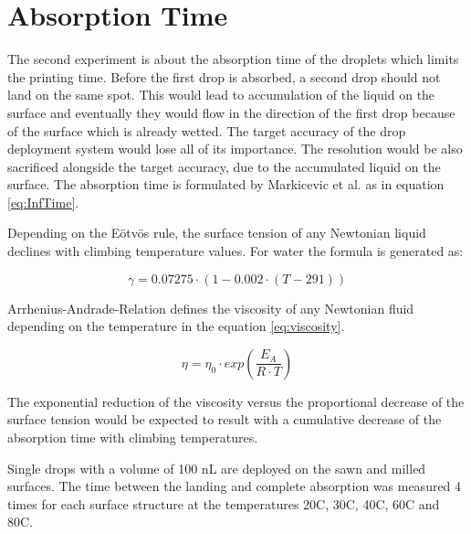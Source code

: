 \section{Absorption Time}
The second experiment is about the absorption time of the droplets which limits the printing time. Before the first drop is absorbed, a second drop should not land on the same spot. This would lead to accumulation of the liquid on the surface and eventually they would flow in the direction of the first drop because of the surface which is already wetted. The target accuracy of the drop deployment system would lose all of its importance. The resolution would be also sacrificed alongside the target accuracy, due to the accumulated liquid on the surface. The absorption time is formulated by Markicevic et al. as in equation \ref{eq:InfTime}.

Depending on the Eötvös rule, the surface tension of any Newtonian liquid declines with climbing temperature values. For water the formula is generated as:

\bigskip

\begin{equation}\label{eq:watergamma}
\gamma =0.07275 \cdotp(1-0.002\cdotp(T-291))
\end{equation}

\bigskip

Arrhenius-Andrade-Relation defines the viscosity of any Newtonian fluid depending on the temperature in the equation \ref{eq:viscosity}.  

\bigskip

\begin{equation}\label{eq:viscosity}
\eta =\eta_0 \cdotp exp(\frac{E_A}{R\cdotp T})
\end{equation}

\bigskip

The exponential reduction of the viscosity  versus the proportional decrease of the surface tension would be expected to result with a cumulative decrease of the absorption time with climbing temperatures.

Single drops with a volume of 100 nL are deployed on the sawn and milled surfaces. The time between the landing and complete absorption was measured 4 times for each surface structure at the temperatures 20\textdegree \space C, 30\textdegree \space C, 40\textdegree \space C, 60\textdegree \space C and 80\textdegree \space C.

\bigskip

